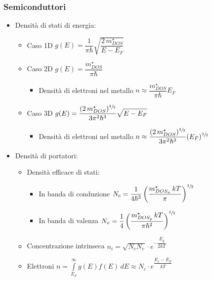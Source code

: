 \documentclass[9pt]{extarticle}
\begin{document}
\newpage

\subsubsection{Semiconduttori}
\begin{itemize}
  \item Densità di stati di energia:
        \begin{itemize}
          \item Caso 1D \( \displaystyle g(E) = \dfrac{1}{\pi \hbar} \sqrt{\dfrac{2 \, m_{DOS}^\star}{E-E_F}} \)
          \item Caso 2D \( g(E) = \dfrac{m_{DOS}^\star}{\pi \hbar} \)
                \begin{itemize}
                  \item Densità di elettroni nel metallo \( n \approx \dfrac{m_{DOS}^\star}{\pi \hbar}  E_F \)
                \end{itemize}
          \item Caso 3D \( \displaystyle g(E) = \dfrac{(2 \, m_{DOS}^\star) ^ {\sfrac{3}{2}}}{3 \pi^2 \hbar^3} \sqrt{E-E_F} \)
                \begin{itemize}
                  \item Densità di elettroni nel metallo \( n \approx  \dfrac{(2 \, m_{DOS}^\star) ^ {\sfrac{3}{2}}}{3 \pi^2 \hbar^3} (E_F) ^ {\sfrac{3}{2}}  \)
                \end{itemize}
        \end{itemize}
  \item Densità di portatori:
        \begin{itemize}
          \item Densità efficace di stati:
                \begin{itemize}
                  \item In banda di conduzione \( N_c = \dfrac{1}{4 \hbar ^ 3} \left(\dfrac{m^{\star}_{DOS_n} \, k T}{\pi} \right) ^ {\sfrac{3}{2}} \)
                  \item In banda di valenza \( N_v = \dfrac{1}{4} \left( \dfrac{ m^{\star}_{DOS_p} \, k T}{\pi \hbar ^ 2} \right) ^ {\sfrac{3}{2}} \)
                \end{itemize}
          \item Concentrazione intrinseca \( \displaystyle n_i = \sqrt{N_c  N_v} \cdot e ^ {-\dfrac{E_{g}}{2kT}} \)
          \item Elettroni \( \displaystyle n = \int\limits_{E_F}^{\infty} g(E) f(E) \, dE \approx N_c \cdot e ^ {\dfrac{E_c - E_F}{kT}} \)

\end{itemize}
\end{itemize}
\end{document}
